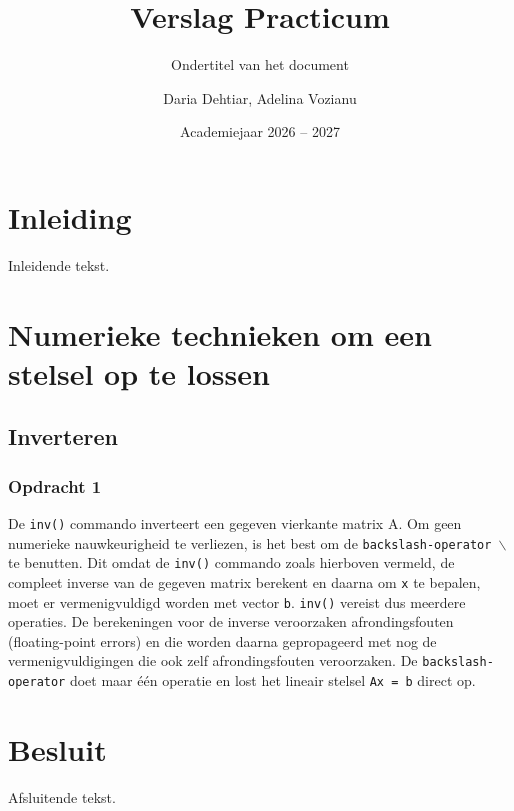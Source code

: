 \documentclass[twoside, kulak]{kulakreport} %
\title{Verslag Practicum}
\subtitle{Ondertitel van het document}
\author{Daria Dehtiar, Adelina Vozianu}
\date{Academiejaar 2026 -- 2027}
\institute{Informatica}
\begin{document}
	
	\titlepage
	
	\tableofcontents
	
	\chapter*{Inleiding}
	Inleidende tekst.
	
	\chapter{Numerieke technieken om een stelsel op te lossen}
	\section{Inverteren}
	\subsection{Opdracht 1} %
	De \texttt{inv()} commando inverteert een gegeven vierkante matrix A. Om geen numerieke nauwkeurigheid te verliezen, is het best om de \texttt{backslash-operator $\backslash$} te benutten. 
	Dit omdat de \texttt{inv()} commando zoals hierboven vermeld, de compleet inverse van de gegeven matrix berekent en daarna om \texttt{x} te bepalen, moet er vermenigvuldigd worden met vector \texttt{b}. \texttt{inv()} vereist dus meerdere operaties. De berekeningen voor de inverse veroorzaken afrondingsfouten (floating-point errors) en die worden daarna gepropageerd met nog de vermenigvuldigingen die ook zelf afrondingsfouten veroorzaken. De \texttt{backslash-operator} doet maar één operatie en lost het lineair stelsel \texttt{Ax = b} direct op.
	
	
	\chapter*{Besluit}
	Afsluitende tekst.
	
	
	
	
\end{document}
